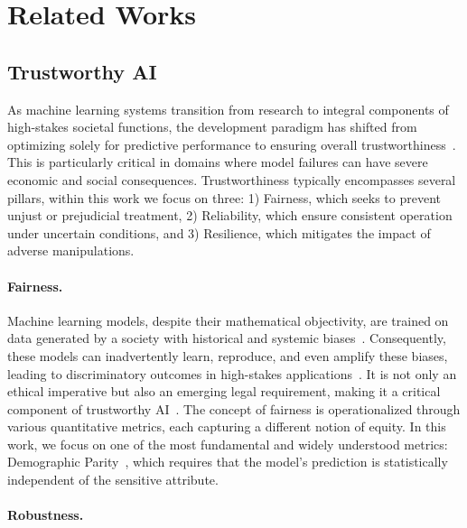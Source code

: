 \documentclass{uai2026}
\begin{document}
\section{Related Works}
\label{sec:RW}

\subsection{Trustworthy AI}

As machine learning systems transition from research to integral components of high-stakes societal functions, the development paradigm has shifted from optimizing solely for predictive performance to ensuring overall trustworthiness~\cite{chkirbene2024large}. This is particularly critical in domains where model failures can have severe economic and social consequences. Trustworthiness typically encompasses several pillars, within this work we focus on three: 1) Fairness, which seeks to prevent unjust or prejudicial treatment, 2) Reliability, which ensure consistent operation under uncertain conditions, and 3) Resilience, which mitigates the impact of adverse manipulations.

\paragraph{Fairness. }

Machine learning models, despite their mathematical objectivity, are trained on data generated by a society with historical and systemic biases~\cite{mehrabi2021survey}. Consequently, these models can inadvertently learn, reproduce, and even amplify these biases, leading to discriminatory outcomes in high-stakes applications~\cite{hall2022systematic}. It is not only an ethical imperative but also an emerging legal requirement, making it a critical component of trustworthy AI~\cite{wachter2020bias}. The concept of fairness is operationalized through various quantitative metrics, each capturing a different notion of equity. In this work, we focus on one of the most fundamental and widely understood metrics: Demographic Parity~\cite{calders2009building}, which requires that the model's prediction is statistically independent of the sensitive attribute.

\paragraph{Robustness. }
\end{document}
